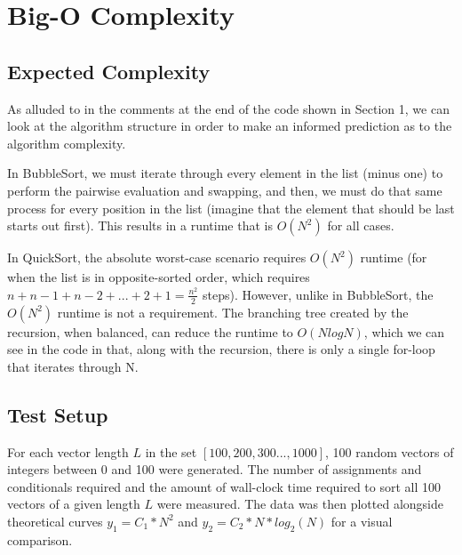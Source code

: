 \documentclass{article}
\begin{document}
\section{Big-O Complexity}
\subsection{Expected Complexity}
As alluded to in the comments at the end of the code shown in Section 1, we can look at the algorithm structure in order to make an informed prediction as to the algorithm complexity. \par
In BubbleSort, we must iterate through every element in the list (minus one) to perform the pairwise evaluation and swapping, and then, we must do that same process for every position in the list (imagine that the element that should be last starts out first). This results in a runtime that is $O(N^2)$ for all cases.  \par
In QuickSort, the absolute worst-case scenario requires $O(N^2)$ runtime (for when the list is in opposite-sorted order, which requires $n + n-1 + n-2 + ... + 2 + 1 = \frac{n^2}{2}$ steps). However, unlike in BubbleSort, the $O(N^2)$ runtime is not a requirement. The branching tree created by the recursion, when balanced, can reduce the runtime to $O(NlogN)$, which we can see in the code in that, along with the recursion, there is only a single for-loop that iterates through N.

\subsection{Test Setup}
For each vector length $L$ in the set $[100,200,300...,1000]$, 100 random vectors of integers between 0 and 100 were generated. The number of assignments and conditionals required and the amount of wall-clock time required to sort all 100 vectors of a given length $L$ were measured. The data was then plotted alongside theoretical curves $y_1 = C_1 * N^2$ and $y_2 = C_2 * N * log_{2}(N)$ for a visual comparison.
 
\end{document}
